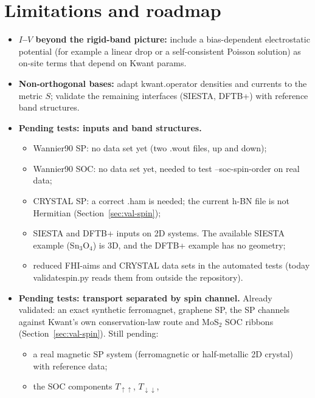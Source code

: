 \documentclass[11pt,a4paper]{article}
\newcommand{\code}[1]{{\ttfamily\def\_{\textunderscore\allowbreak}\def\slash{/\allowbreak}#1}}
\begin{document}
\section{Limitations and roadmap}\label{sec:roadmap}
\begin{itemize}
  \item \textbf{$I$--$V$ beyond the rigid-band picture:} include a bias-dependent
        electrostatic potential (for example a linear drop or a self-consistent
        Poisson solution) as on-site terms that depend on Kwant \code{params}.
  \item \textbf{Non-orthogonal bases:} adapt \code{kwant.operator} densities and
        currents to the metric $S$; validate the remaining interfaces (SIESTA, DFTB+) with
        reference band structures.
  \item \textbf{Pending tests: inputs and band structures.}
        \begin{itemize}[nosep]
          \item Wannier90 SP: no data set yet (two \code{.wout} files, up and down);
          \item Wannier90 SOC: no data set yet, needed to test \code{--soc-spin-order} on
                real data;
          \item CRYSTAL SP: a correct \code{.ham} is needed; the current h-BN file is not
                Hermitian (Section~\ref{sec:val-spin});
          \item SIESTA and DFTB+ inputs on 2D systems. The available SIESTA example
                (Sn$_3$O$_4$) is 3D, and the DFTB+ example has no geometry;
          \item reduced FHI-aims and CRYSTAL data sets in the automated tests (today
                \code{validate\_spin.py} reads them from outside the repository).
        \end{itemize}
  \item \textbf{Pending tests: transport separated by spin channel.} Already validated: an
        exact synthetic ferromagnet, graphene SP, the SP channels against Kwant's own
        conservation-law route and MoS$_2$ SOC ribbons (Section~\ref{sec:val-spin}). Still pending:
        \begin{itemize}[nosep]
          \item a real magnetic SP system (ferromagnetic or half-metallic 2D crystal) with
                reference data;
          \item the SOC components $T_{\uparrow\uparrow}$, $T_{\downarrow\downarrow}$,

\end{itemize}
\end{itemize}
\end{document}
